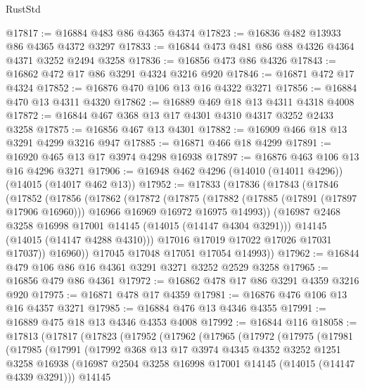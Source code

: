 \begin{lexlean}{RustStd}
\begin{coremodule}
@17817 := @16884 @483 @86 @4365 @4374
@17823 := @16836 @482 @13933 @86 @4365 @4372 @3297
@17833 := @16844 @473 @481 @86 @88 @4326 @4364 @4371 @3252 @2494 @3258
@17836 := @16856 @473 @86 @4326
@17843 := @16862 @472 @17 @86 @3291 @4324 @3216 @920
@17846 := @16871 @472 @17 @4324
@17852 := @16876 @470 @106 @13 @16 @4322 @3271
@17856 := @16884 @470 @13 @4311 @4320
@17862 := @16889 @469 @18 @13 @4311 @4318 @4008
@17872 := @16844 @467 @368 @13 @17 @4301 @4310 @4317 @3252 @2433 @3258
@17875 := @16856 @467 @13 @4301
@17882 := @16909 @466 @18 @13 @3291 @4299 @3216 @947
@17885 := @16871 @466 @18 @4299
@17891 := @16920 @465 @13 @17 @3974 @4298 @16938
@17897 := @16876 @463 @106 @13 @16 @4296 @3271
@17906 := @16948 @462 @4296 (@14010 (@14011 @4296)) (@14015 (@14017 @462 @13))
@17952 := @17833
    (@17836
      (@17843
        (@17846
          (@17852
            (@17856
              (@17862
                (@17872
                  (@17875
                    (@17882
                      (@17885 (@17891 (@17897 @17906 @16960)))
                      @16966
                      @16969
                      @16972
                      @16975
                      @14993))
                  (@16987 @2468 @3258 @16998 @17001 @14145 (@14015 (@14147 @4304 @3291)))
                  @14145
                  (@14015 (@14147 @4288 @4310)))
                @17016
                @17019
                @17022
                @17026
                @17031
                @17037))
            @16960))
        @17045
        @17048
        @17051
        @17054
        @14993))
@17962 := @16844 @479 @106 @86 @16 @4361 @3291 @3271 @3252 @2529 @3258
@17965 := @16856 @479 @86 @4361
@17972 := @16862 @478 @17 @86 @3291 @4359 @3216 @920
@17975 := @16871 @478 @17 @4359
@17981 := @16876 @476 @106 @13 @16 @4357 @3271
@17985 := @16884 @476 @13 @4346 @4355
@17991 := @16889 @475 @18 @13 @4346 @4353 @4008
@17992 := @16844 @116
@18058 := @17813
    (@17817
      (@17823
        (@17952
          (@17962
            (@17965
              (@17972
                (@17975
                  (@17981
                    (@17985
                      (@17991
                        (@17992
                          @368
                          @13
                          @17
                          @3974
                          @4345
                          @4352
                          @3252
                          @1251
                          @3258
                          @16938
                          (@16987 @2504 @3258 @16998 @17001 @14145 (@14015 (@14147 @4339 @3291)))
                          @14145

\end{coremodule}
\end{lexlean}
